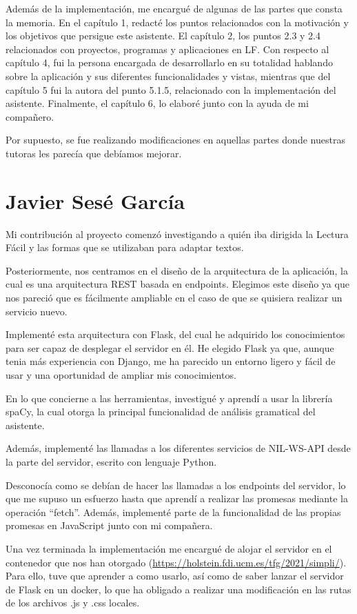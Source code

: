 Además de la implementación, me encargué de algunas de las partes que consta la memoria. En el capítulo 1, redacté los puntos relacionados con la motivación y los objetivos que persigue este asistente. El capítulo 2, los puntos 2.3 y 2.4 relacionados con proyectos, programas y aplicaciones en LF. Con respecto al capítulo 4, fui la persona encargada de desarrollarlo en su totalidad hablando sobre la aplicación y sus diferentes funcionalidades y vistas, mientras que del capítulo 5 fui la autora del punto 5.1.5, relacionado con la implementación del asistente. Finalmente, el capítulo 6, lo elaboré junto con la ayuda de mi compañero.

Por supuesto, se fue realizando modificaciones en aquellas partes donde nuestras tutoras les parecía que debíamos mejorar.

\section{Javier Sesé García}

Mi contribución al proyecto comenzó investigando a quién iba dirigida la Lectura Fácil y las formas que se utilizaban para adaptar textos. 

Posteriormente, nos centramos en el diseño de la arquitectura de la aplicación, la cual es una arquitectura REST basada en endpoints. Elegimos este diseño ya que nos pareció que es fácilmente ampliable en el caso de que se quisiera realizar un servicio nuevo.

Implementé esta arquitectura con Flask, del cual he adquirido los conocimientos para ser capaz de desplegar el servidor en él. He elegido Flask ya que, aunque tenia más experiencia con Django, me ha parecido un entorno ligero y fácil de usar y una oportunidad de ampliar mis conocimientos.

En lo que concierne a las herramientas, investigué y aprendí a usar la librería spaCy, la cual otorga la principal funcionalidad de análisis gramatical del asistente. 


Además, implementé las llamadas a los diferentes servicios de NIL-WS-API desde la parte del servidor, escrito con lenguaje Python.

Desconocía como se debían de hacer las llamadas a los endpoints del servidor, lo que me supuso un esfuerzo hasta que aprendí a realizar las promesas mediante la operación ``fetch''. Además, implementé parte de la funcionalidad de las propias promesas en JavaScript junto con mi compañera.

Una vez terminada la implementación me encargué de alojar el servidor en el contenedor que nos han otorgado (\url{https://holstein.fdi.ucm.es/tfg/2021/simpli/}). Para ello, tuve que aprender a como usarlo, así como de saber lanzar el servidor de Flask en un docker, lo que ha obligado a realizar una modificación en las rutas de los archivos .js y .css locales.

